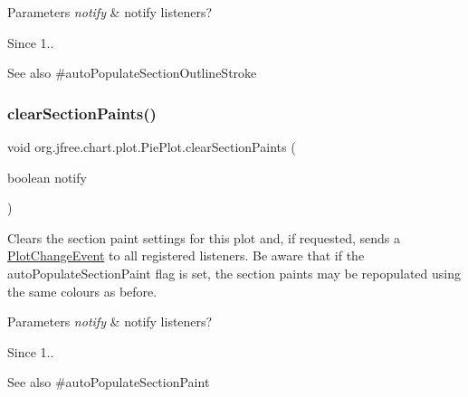 \begin{DoxyParams}{Parameters}
{\em notify} & notify listeners?\\
\hline
\end{DoxyParams}
\begin{DoxySince}{Since}
1..
\end{DoxySince}
\begin{DoxySeeAlso}{See also}
\#auto\+Populate\+Section\+Outline\+Stroke 
\end{DoxySeeAlso}
\mbox{\label{classorg_1_1jfree_1_1chart_1_1plot_1_1_pie_plot_a9de19ba543feb036b17986b5c654f8f8}} 
\subsubsection{\texorpdfstring{clear\+Section\+Paints()}{clearSectionPaints()}}
{\footnotesize\ttfamily void org.\+jfree.\+chart.\+plot.\+Pie\+Plot.\+clear\+Section\+Paints (\begin{DoxyParamCaption}\item[{boolean}]{notify }\end{DoxyParamCaption})}

Clears the section paint settings for this plot and, if requested, sends a \mbox{\hyperlink{}{Plot\+Change\+Event}} to all registered listeners. Be aware that if the {\ttfamily auto\+Populate\+Section\+Paint} flag is set, the section paints may be repopulated using the same colours as before.


\begin{DoxyParams}{Parameters}
{\em notify} & notify listeners?\\
\hline
\end{DoxyParams}
\begin{DoxySince}{Since}
1..
\end{DoxySince}
\begin{DoxySeeAlso}{See also}
\#auto\+Populate\+Section\+Paint 
\end{DoxySeeAlso}
\mbox{\label{classorg_1_1jfree_1_1chart_1_1plot_1_1_pie_plot_aa5257f387f4782dae8a2105bdfee40b9}} 
